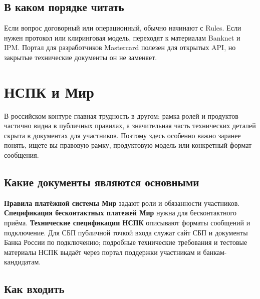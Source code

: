 




\subsection*{В каком порядке читать}

Если вопрос договорный или операционный, обычно начинают
с Rules. Если нужен протокол или клиринговая модель, переходят
к материалам Banknet и IPM. Портал для разработчиков Mastercard
полезен для открытых API, но закрытые технические документы
он не заменяет.

\section{НСПК и Мир}
\label{sec:ps-nspk}

В российском контуре главная трудность в другом: рамка ролей
и продуктов частично видна в публичных правилах, а значительная
часть технических деталей скрыта в документах для участников.
Поэтому здесь особенно важно заранее понять, ищете вы правовую
рамку, продуктовую модель или конкретный формат сообщения.

\subsection*{Какие документы являются основными}

\textbf{Правила платёжной системы Мир} задают роли и обязанности
участников. \textbf{Спецификация бесконтактных платежей Мир}
нужна для бесконтактного приёма. \textbf{Технические спецификации
НСПК} описывают форматы сообщений и подключение. Для СБП публичной
точкой входа служат сайт СБП и документы Банка России по подключению;
подробные технические требования и тестовые материалы НСПК выдаёт
через портал поддержки участникам и банкам-кандидатам.





\subsection*{Как входить}

